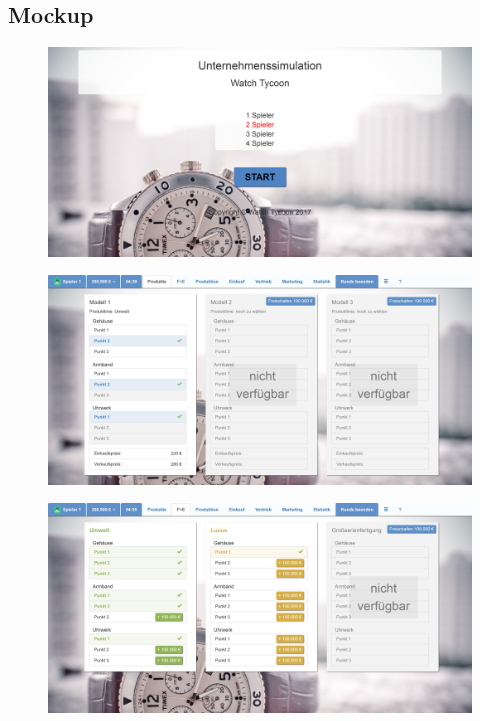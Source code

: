 \subsection{Mockup}
\begin{figure} [h]
	\centering
	\includegraphics[scale=0.1]{img/bilder_layout/MockUp1.jpg} 
\end{figure}
\begin{figure} [h]
	\centering
	\includegraphics[scale=0.1]{img/bilder_layout/MockUp2.jpg} 
\end{figure}
\begin{figure} 
	\centering
	\includegraphics[scale=0.1]{img/bilder_layout/MockUp3.jpg} 
\end{figure}
